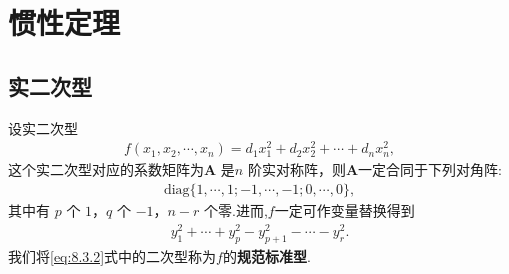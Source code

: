 \documentclass[../../main.tex]{subfiles}%
\begin{document}
\section{惯性定理}

\subsection{实二次型}

\begin{theorem}[实二次型的规范标准型]\label{theorem:实二次型的规范标准型}
设实二次型
\begin{align*}
f(x_1,x_2,\cdots,x_n)=d_1x_1^2 + d_2x_2^2 + \cdots + d_nx_n^2,
\end{align*}
这个实二次型对应的系数矩阵为$\boldsymbol{A}$ 是$n$ 阶实对称阵，则$\boldsymbol{A}$一定合同于下列对角阵:
\begin{align}
\mathrm{diag}\{1,\cdots,1;-1,\cdots,-1;0,\cdots,0\},\label{eq:8.3.3}
\end{align}
其中有 $p$ 个 $1$，$q$ 个 $-1$，$n - r$ 个零.进而,$f$一定可作变量替换得到
\begin{align}
y_1^2 + \cdots + y_p^2 - y_{p + 1}^2 - \cdots - y_r^2.\label{eq:8.3.2}
\end{align}
我们将\eqref{eq:8.3.2}式中的二次型称为$f$的\textbf{规范标准型}.
\end{theorem}
\end{document}
